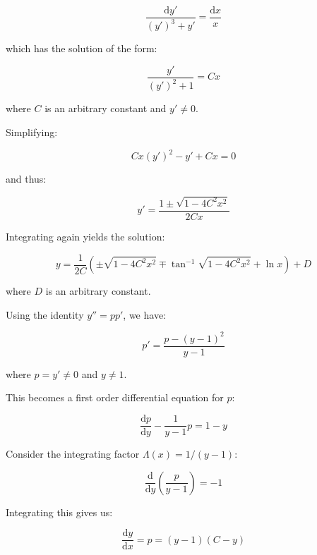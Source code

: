 \documentclass[12pt]{article}
\begin{document}
\begin{equation}
    \frac{\mathrm{d}y'}{(y')^{3} + y'} = \frac{\mathrm{d}x}{x}
\end{equation}

which has the solution of the form:

\begin{equation}
    \frac{y'}{(y')^{2} + 1} = Cx
\end{equation}

where $C$ is an arbitrary constant and $y' \ne 0$.

Simplifying:

\begin{equation}
    Cx(y')^{2} - y' + Cx = 0
\end{equation}

and thus:

\begin{equation}
    y' = \frac{1 \pm \sqrt{1 - 4C^{2}x^{2}}}{2Cx}
\end{equation}

Integrating again yields the solution:

\begin{equation}
    y = \frac{1}{2C} \left( \pm \sqrt{1 - 4C^{2}x^{2}} \mp \tan^{-1} \sqrt{1 - 4C^{2}x^{2}} + \ln{x} \right) + D
\end{equation}

where $D$ is an arbitrary constant.

Using the identity $y'' = p p'$, we have:

\begin{equation}
    p' = \frac{p - (y - 1)^{2}}{y - 1}
\end{equation}

where $p = y' \ne 0$ and $y \ne 1$.

This becomes a first order differential equation for $p$:

\begin{equation}
    \frac{\mathrm{d}p}{\mathrm{d}y} - \frac{1}{y - 1}p = 1 - y
\end{equation}

Consider the integrating factor $\Lambda(x) = 1/(y - 1)$:

\begin{equation}
    \frac{\mathrm{d}}{\mathrm{d}y} \left( \frac{p}{y - 1} \right) = -1
\end{equation}

Integrating this gives us:

\begin{equation}
    \frac{\mathrm{d}y}{\mathrm{d}x} = p = (y - 1) (C - y)
\end{equation}
\end{document}
